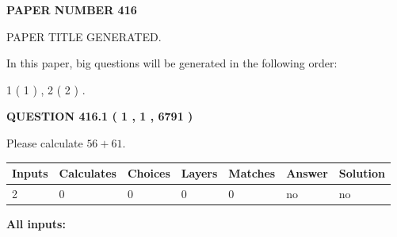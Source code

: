\documentclass[12pt]{article}
\begin{document}
 
 
   
   
\newpage 
\setcounter{page}{ 
   416001 } 
   
   
   
   
 {\textbf{ \Large{ PAPER NUMBER  416  }}}
   
   
\vspace{0.2in}
   
   
   
   
   
   
   
   
 \vspace{0.2in}
 
 
 
 
   
   
 PAPER TITLE GENERATED.
   
   
   
\vspace{0.2in}
   
In this paper, big questions will be generated in the following order: 
   
   
   1 ( 1 )
 ,
   2 ( 2 )
 .
  
\vspace{0.2in}
  
{\textbf{\Large{QUESTION
416.1 
 ( 1 , 1 , 6791 )
}}}
  
  
 
Please calculate $ %
56 +  %
61 $.
 
 
   
   
   
   
\noindent\begin{tabular}{|l|l|l|l|l|l|l|}
 \hline
Inputs & Calculates & Choices & Layers & Matches & Answer & Solution \\ \hline
 2  & 
 0  & 
 0
  & 
 0  & 
 0  & 
  no & 
  no 
  \\ \hline
 \end{tabular}
   
   
   
   
\noindent{}
   
   
   
   
\noindent\vspace{0.1in}\hspace{-0.08in} {\textbf{\Large{All inputs: }}}
   
\end{document}
